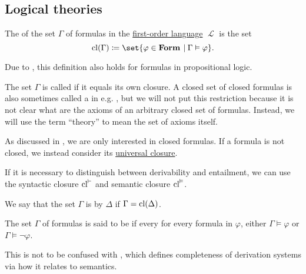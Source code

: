 \subsection{Logical theories}\label{subsec:logical_theories}

\begin{definition}\label{def:first_order_theory}
  The  of the set \( \Gamma \) of formulas in the \hyperref[def:first_order_syntax]{first-order language} \( \mscrL \) is the set
  \begin{equation*}
    \cl(\Gamma) \coloneqq \set{ \varphi \in \boldop{Form} \given \Gamma \vDash \varphi }.
  \end{equation*}

  Due to , this definition also holds for formulas in propositional logic.

  The set \( \Gamma \) is called  if it equals its own closure. A closed set of closed formulas is also sometimes called a  in e.g. \cite[def. 33.1]{OpenLogicFull}, but we will not put this restriction because it is not clear what are the axioms of an arbitrary closed set of formulas. Instead, we will use the term \enquote{theory} to mean the set of axioms itself.

  As discussed in , we are only interested in closed formulas. If a formula is not closed, we instead consider its \hyperref[thm:implicit_universal_quantification]{universal closure}.

  If it is necessary to distinguish between derivability and entailment, we can use the syntactic closure \( \operatorname{cl}^\vdash \) and semantic closure \( \operatorname{cl}^\vDash \).

  \begin{thmenum}
     We say that the set \( \Gamma \) is  by \( \Delta \) if \( \Gamma = \operatorname{cl}(\Delta) \).

     The set \( \Gamma \) of formulas is said to be  if every for every formula in \( \varphi \), either \( \Gamma \vDash \varphi \) or \( \Gamma \vDash \neg \varphi \).

    This is not to be confused with , which defines completeness of derivation systems via how it relates to semantics.
  \end{thmenum}
\end{definition}

